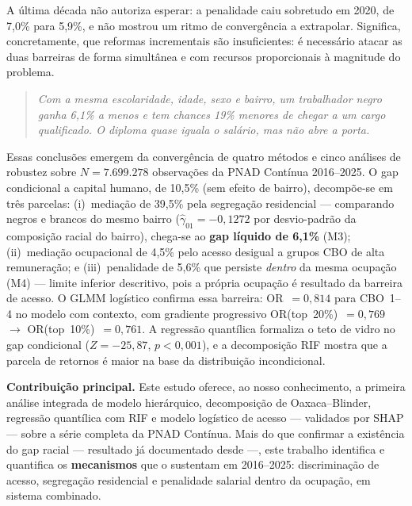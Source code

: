 \documentclass[12pt, a4paper, oneside]{article}
\begin{document}
A última década não autoriza esperar: a penalidade caiu sobretudo em 2020, de 7{,}0\% para 5{,}9\%, e não mostrou um ritmo de convergência a extrapolar.
Significa, concretamente, que reformas incrementais são insuficientes:
é necessário atacar as duas barreiras de forma simultânea e com recursos
proporcionais à magnitude do problema.

\medskip

\begin{quote}
\textit{Com a mesma escolaridade, idade, sexo e bairro, um trabalhador negro ganha 6,1\% a menos e tem chances 19\% menores de chegar a um cargo qualificado. O diploma quase iguala o salário, mas não abre a porta.}
\end{quote}

\medskip

Essas conclusões emergem da convergência de quatro métodos e cinco análises
de robustez sobre $N=7.699.278$ observações da PNAD Contínua 2016--2025.
O gap condicional a capital humano, de 10,5\% (sem efeito de bairro),
decompõe-se em três parcelas: (i)~mediação de 39,5\% pela segregação
residencial --- comparando negros e brancos do mesmo bairro ($\hat{\gamma}_{01}=−0,1272$
por desvio-padrão da composição racial do bairro), chega-se ao \textbf{gap líquido de 6,1\%} (M3);
(ii)~mediação ocupacional de 4,5\% pelo acesso desigual a grupos CBO de alta
remuneração; e (iii)~penalidade de 5,6\% que persiste \emph{dentro} da mesma
ocupação (M4) --- limite inferior descritivo, pois a própria ocupação é
resultado da barreira de acesso.
O GLMM logístico confirma essa barreira: OR~$=0,814$ para CBO~1--4 no modelo
com contexto, com gradiente progressivo OR(top~20\%)~$=0,769$ $\to$
OR(top~10\%)~$=0,761$. A regressão quantílica formaliza o teto de vidro no gap
condicional ($Z=-25{,}87$, $p<0{,}001$), e a decomposição RIF mostra que a parcela
de retornos é maior na base da distribuição incondicional.


\bigskip

\noindent\textbf{Contribuição principal.}
Este estudo oferece, ao nosso conhecimento, a primeira análise integrada de
modelo hierárquico, decomposição de Oaxaca--Blinder, regressão quantílica com
RIF e modelo logístico de acesso --- validados por SHAP --- sobre a série
completa da PNAD Contínua.
Mais do que confirmar a existência do gap racial --- resultado já documentado
desde  ---, este trabalho identifica e quantifica os
\textbf{mecanismos} que o sustentam em 2016--2025: discriminação de acesso,
segregação residencial e penalidade salarial dentro da ocupação, em sistema combinado.
\end{document}
